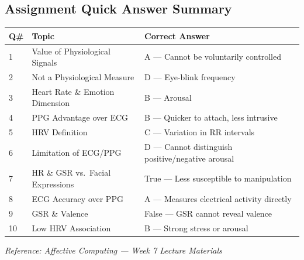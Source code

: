 \documentclass[11pt,a4paper]{article}
\newcommand{\bb}[1]{\textbf{#1}}
\begin{document}
\medskip
\subsection*{Assignment Quick Answer Summary}

\begin{center}
\renewcommand{\arraystretch}{1.4}
\begin{tabular}{|L{0.8cm}|L{6.2cm}|L{8.2cm}|}
\hline
\bb{Q\#} & \bb{Topic} & \bb{Correct Answer} \\
 & Value of Physiological Signals & A --- Cannot be voluntarily controlled \\
2 & Not a Physiological Measure & D --- Eye-blink frequency \\
3 & Heart Rate \& Emotion Dimension & B --- Arousal \\
4 & PPG Advantage over ECG & B --- Quicker to attach, less intrusive \\
5 & HRV Definition & C --- Variation in RR intervals \\
6 & Limitation of ECG/PPG & D --- Cannot distinguish positive/negative arousal \\
7 & HR \& GSR vs.\ Facial Expressions & True --- Less susceptible to manipulation \\
8 & ECG Accuracy over PPG & A --- Measures electrical activity directly \\
9 & GSR \& Valence & False --- GSR cannot reveal valence \\
10 & Low HRV Association & B --- Strong stress or arousal \\
\hline
\end{tabular}
\end{center}

\medskip
{\small\textit{Reference: Affective Computing --- Week 7 Lecture Materials}}
\end{document}

